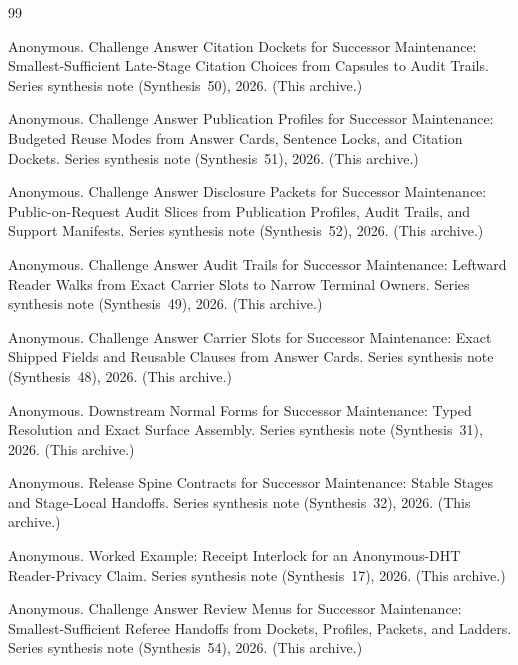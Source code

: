 \documentclass[11pt]{article}
\begin{document}
\begin{thebibliography}{99}\small

Anonymous.
\newblock Challenge Answer Citation Dockets for Successor Maintenance: Smallest-Sufficient Late-Stage Citation Choices from Capsules to Audit Trails.
\newblock Series synthesis note (Synthesis~50), 2026. (This archive.)

Anonymous.
\newblock Challenge Answer Publication Profiles for Successor Maintenance: Budgeted Reuse Modes from Answer Cards, Sentence Locks, and Citation Dockets.
\newblock Series synthesis note (Synthesis~51), 2026. (This archive.)

Anonymous.
\newblock Challenge Answer Disclosure Packets for Successor Maintenance: Public-on-Request Audit Slices from Publication Profiles, Audit Trails, and Support Manifests.
\newblock Series synthesis note (Synthesis~52), 2026. (This archive.)

Anonymous.
\newblock Challenge Answer Audit Trails for Successor Maintenance: Leftward Reader Walks from Exact Carrier Slots to Narrow Terminal Owners.
\newblock Series synthesis note (Synthesis~49), 2026. (This archive.)

Anonymous.
\newblock Challenge Answer Carrier Slots for Successor Maintenance: Exact Shipped Fields and Reusable Clauses from Answer Cards.
\newblock Series synthesis note (Synthesis~48), 2026. (This archive.)

Anonymous.
\newblock Downstream Normal Forms for Successor Maintenance: Typed Resolution and Exact Surface Assembly.
\newblock Series synthesis note (Synthesis~31), 2026. (This archive.)

Anonymous.
\newblock Release Spine Contracts for Successor Maintenance: Stable Stages and Stage-Local Handoffs.
\newblock Series synthesis note (Synthesis~32), 2026. (This archive.)

Anonymous.
\newblock Worked Example: Receipt Interlock for an Anonymous-DHT Reader-Privacy Claim.
\newblock Series synthesis note (Synthesis~17), 2026. (This archive.)

Anonymous.
\newblock Challenge Answer Review Menus for Successor Maintenance: Smallest-Sufficient Referee Handoffs from Dockets, Profiles, Packets, and Ladders.
\newblock Series synthesis note (Synthesis~54), 2026. (This archive.)



\end{thebibliography}
\end{document}
